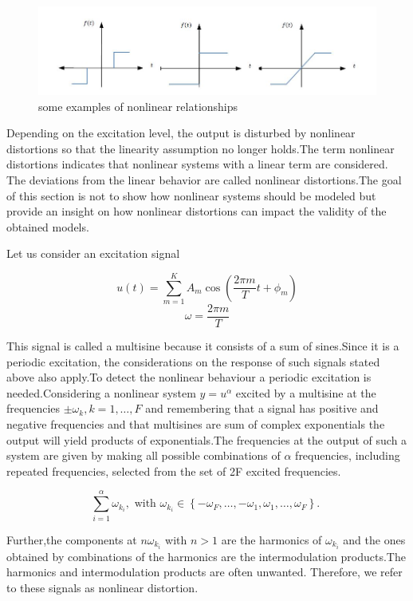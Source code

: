 \documentclass[a4paper,12pt]{article}
\numberwithin{equation}{section}
\begin{document}
\begin{figure}[H]
    \includegraphics[scale=1]{examplenonlinear.JPG}
    \centering
    \caption{some examples of nonlinear relationships}
    \label{fig:examplenonlinear}
\end{figure}



Depending on the excitation level, the output is disturbed by nonlinear distortions so that the linearity assumption no longer holds.The term nonlinear distortions indicates that nonlinear systems with a linear term are considered. The deviations from the linear behavior are called nonlinear distortions.The goal of this section is not to show how nonlinear systems should be modeled but provide an insight on how nonlinear distortions can impact the validity of the obtained models.

Let us consider an excitation signal

\[u(t)=\sum_{m=1}^{K} A_{m} \cos \left(\frac{2 \pi m}{T} t+\phi_{m}\right)\]
\[\omega=\frac{2 \pi m}{T}\]

This signal is called a multisine because it consists of a sum of sines.Since it is a periodic excitation, the considerations on the response of such signals stated above also apply.To detect the nonlinear behaviour a periodic excitation is needed.Considering a nonlinear system $y=u^{\alpha}$ excited by a multisine at the frequencies $\pm \omega_{k}, k=1, \ldots, F$ and remembering that a signal has  positive and negative frequencies and that multisines are sum of complex exponentials the output will yield products of exponentials.The frequencies at the output of such a system are given by making all possible combinations of $\alpha$ frequencies, including repeated frequencies, selected from the set of 2F excited frequencies.

\[\sum_{i=1}^{\alpha} \omega_{k_{i}}, \text { with } \omega_{k_{i}} \in\left\{-\omega_{F}, \ldots,-\omega_{1}, \omega_{1}, \ldots, \omega_{F}\right\} \text {. }\]

Further,the components at $n\omega_{k_{i}}$ with $n > 1$ are the harmonics of $\omega_{k_{i}}$ and the ones obtained by combinations of the harmonics are the intermodulation products.The harmonics and intermodulation products are often unwanted. Therefore, we refer to these signals as nonlinear distortion.
\end{document}
